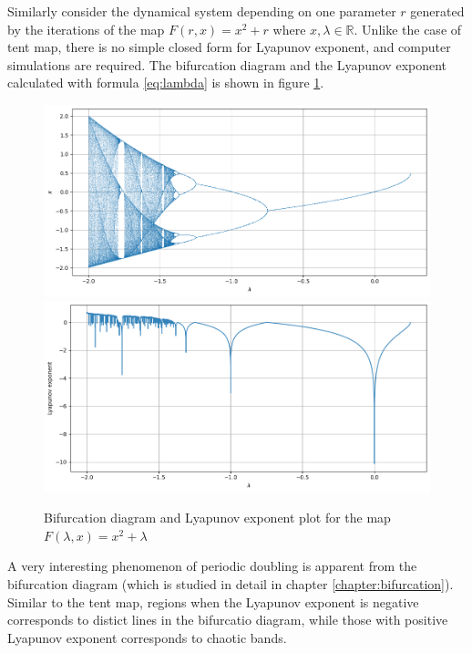 \begin{exmp}
	Similarly consider the dynamical system depending on one parameter $r$ generated by the iterations of the map
    $F(r,x)=x^2+r$ where $x,\lambda \in \mathbb{R}$.
	Unlike the case of tent map, there is no simple closed form for Lyapunov exponent, and computer simulations are required. 
	The bifurcation diagram and the Lyapunov exponent calculated with formula \eqref{eq:lambda} is shown in figure \ref{fig:lyapunov_x^2}.
    \begin{figure}
        \centering
        \includegraphics[width=1\linewidth]{Bifurcation Images/bifurcation_x^2.png}
        \includegraphics[width=1\linewidth]{Bifurcation Images/lyapunov_x^2.png}
        \caption{Bifurcation diagram and Lyapunov exponent plot for the map $F(\lambda,x)=x^2+\lambda$}
        \label{fig:lyapunov_x^2}
    \end{figure}
	A very interesting phenomenon of periodic doubling is apparent from the bifurcation diagram (which is studied in detail in chapter \ref{chapter:bifurcation}).
	Similar to the tent map, regions when the Lyapunov exponent is negative corresponds to distict lines in the bifurcatio diagram, while those with positive Lyapunov exponent corresponds to chaotic bands.
\end{exmp}




